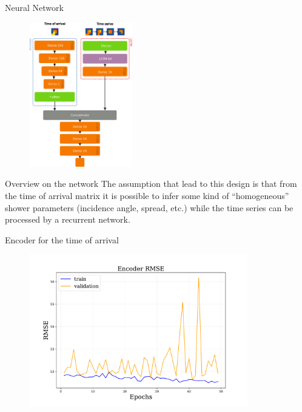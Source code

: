 \documentclass{beamer}
\begin{document}
\begin{frame}{Neural Network}
    \begin{figure}
        \centering
        \includegraphics[width=0.4\textwidth]{figures/model.pdf}
    \end{figure}
\end{frame}
\begin{frame}{Overview on the network}
    The assumption that lead to this design is that from the time of arrival matrix
    it is possible to infer some kind of ``homogeneous'' shower parameters (incidence angle, spread, etc.)
    while the time series can be processed by a recurrent network.
\end{frame}

\begin{frame}{Encoder for the time of arrival}
    \begin{figure}
        \centering
        \includegraphics[width=0.85\textwidth]{figures/encoder_rmse.pdf}
    \end{figure}
        
\end{frame}
\end{document}

